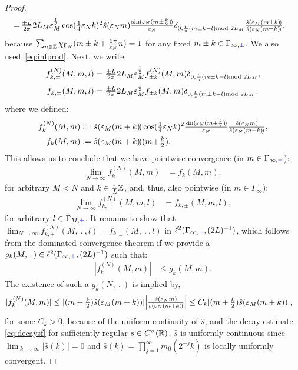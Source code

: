 \documentclass[a4paper, 11pt]{article}
\newcommand{\ltwo}{\ell^{2}}
\DeclareMathOperator{\1}{\mathds{1}}
\begin{document}
\begin{proof}
\begin{align*}
&\!=\!\tfrac{\pm L}{2\pi}2L_{M}\vep_{M}^{\frac{1}{2}} \cos(\tfrac{1}{4}\vep_{N}k)^{2}\hat{s}(\vep_{N}m)\tfrac{\sin(\vep_{N}(m\pm\frac{k}{2})\!)}{\vep_{N}} \delta_{0,\frac{L}{\pi}(m\pm k-l)\!\!\!\!\mod 2L_{M}}\tfrac{\hat{s}(\vep_{M}(m\pm k)\!)}{\hat{s}(\vep_{N}(m\pm k)\!)},
\end{align*}
because $\sum_{n\in\mathbb{Z}}\chi_{\Gamma_{N}}(m\pm k+\tfrac{2\pi}{\varepsilon_{N}}n) = 1$ for any fixed $m\pm k\in\Gamma_{\infty,{\color{blue}\pm}}$. We also used \eqref{eq:infprod}. Next, we write:
\begin{align*}
f^{(N)}_{k,\pm}(M,m,l) & = \tfrac{\pm L}{2\pi}2L_{M}\vep_{M}^{\frac{1}{2}}f^{(N)}_{\pm k}(M,m)\delta_{0,\frac{L}{\pi}(m\pm k-l)\!\!\!\!\mod 2L_{M}}, \\
f_{k,\pm}(M,m,l) & =  \tfrac{\pm L}{2\pi}2L_{M}\vep_{M}^{\frac{1}{2}}f_{\pm k}(M,m)\delta_{0,\frac{L}{\pi}(m\pm k-l)\!\!\!\!\mod 2L_{M}}.
\end{align*}
where we defined:
\begin{align*}
f^{(N)}_{k}(M,m) & := \hat{s}(\varepsilon_{M}(m+k)\!)\cos(\tfrac{1}{4}\varepsilon_{N}k)^{2}\tfrac{\sin(\varepsilon_{N}(m+\frac{k}{2})\!)}{\varepsilon_{N}}\tfrac{\hat{s}(\varepsilon_{N}m)}{\hat{s}(\varepsilon_{N}(m+k)\!)}, \\
f_{k}(M,m) & := \hat{s}(\varepsilon_{M}(m+k)\!)(m\!+\!\tfrac{k}{2}).
\end{align*}
This allows us to conclude that we have pointwise convergence (in $m\in\Gamma_{\infty,{\color{blue}\pm}}$):
\begin{align*}
\lim_{N\rightarrow\infty}f^{(N)}_{k}(M,m) & = f_{k}(M,m),
\end{align*}
for arbitrary $M<N$ and $k\in\tfrac{\pi}{L}\mathbb{Z}$, and, thus, also pointwise (in $m\in\Gamma_{\infty}$):
\begin{align*}
\lim_{N\rightarrow\infty}f^{(N)}_{k,\pm}(M,m,l) & = f_{k,\pm}(M,m,l),
\end{align*}
for arbitrary $l\in\Gamma_{M,{\color{blue}\pm}}$. It remains to show that $\lim_{N\rightarrow\infty}f^{(N)}_{k,\pm}(M,\!\ .\!\ ,l) = f_{k,\pm}(M,\!\ .\!\ ,l)$ in $\ltwo(\Gamma_{\infty,{\color{blue}\pm}},(2L)^{-1})$, which follows from the dominated convergence theorem if we provide a $g_{k}(M,\!\ .\!\ )\in\ltwo(\Gamma_{\infty,{\color{blue}\pm}}, (2L)^{-1})$ such that:
\begin{align*}
|f^{(N)}_{k}(M,m)| & \leq g_{k}(M,m).
\end{align*}
The existence of such a $g_{k}(N,\!\ .\!\ )$ is implied by,
\begin{align*}
|f^{(N)}_{k}(M,m)| & \leq |(m+\tfrac{k}{2})\hat{s}(\varepsilon_{M}(m+k))|\Big|\tfrac{\hat{s}(\varepsilon_{N}m)}{\hat{s}(\varepsilon_{N}(m+k)\!)}\Big| \leq C_{k}|(m+\tfrac{k}{2})\hat{s}(\varepsilon_{M}(m+k))|,
\end{align*}
for some $C_{k}>0$, because of the uniform continuity of $\hat{s}$, and the decay estimate \eqref{eq:decaysf} for sufficiently regular $s\in C^{\alpha}(\mathbb{R})$. $\hat{s}$ is uniformly continuous since $\lim_{|k|\rightarrow\infty}|\hat{s}(k)|=0$ and $\hat{s}(k) = \prod_{j=1}^{\infty}m_{0}(2^{-j}k)$ is locally uniformly convergent.
\end{proof}
\end{document}
